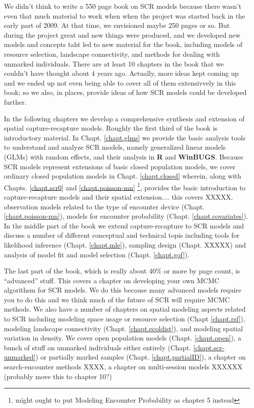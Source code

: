 We didn't think to write a 550 page book on SCR models because there
wasn't even that much material to work when when the project was
started back in the early part of 2009. At that time, we envisioned
maybe 250 pages or so. But during the project great and new things
were produced, and we developed new models and concepts taht led to
new material for the book, including models of resource selection,
landscape connectivity, and methods for dealing with unmarked
individuals. There are at least 10 chapters in the book that we
couldn't have thought about 4 years ago. Actually, more ideas kept
coming up and we ended up not even being able to cover all of them
extensivvely in this book; so we also, in places, provide ideas of how
SCR models could be developed further.

In the following chapters we develop a comprehensive synthesis and
extension of spatial capture-recapture models.  Roughly the first
third of the book is introductory material. In
Chapt. \ref{chapt.glms} we provide the basic analysis tools to
understand and analyze SCR models, namely generalized linear models
(GLMs) with random effects, and their analysis in {\bf R} and {\bf
  WinBUGS}.  Because SCR models represent extensions of basic closed
population models, we cover ordinary closed population models in
Chapt. \ref{chapt.closed} wherein, along with Chapts. \ref{chapt.scr0}
and \ref{chapt.poisson-mn} \footnote{might ought to put Modeling
  Encounter Probability as chapter 5 instead}, provides the basic
introduction to capture-recapture models and their spatial
extension.... this covers XXXXX.  observation models related to the
type of encounter device (Chapt. \ref{chapt.poisson-mn}), models for
encounter probability (Chapt. \ref{chapt.covariates}). In the middle
part of the book we extend capture-recapture to SCR models and discuss
a number of different conceptual and technical topis including tools
for likelihood inference (Chapt. \ref{chapt.mle}), sampling design
(Chapt. XXXXX) and analysis of model fit and model selection
(Chapt. \ref{chapt.gof}).

The last part of the book, which is really about 40\% or more by page
count, is ``advanced'' stuff. This covers a chapter on developing your
own MCMC algorithsm for SCR models. We do this because many advanced
models require you to do this and we think much of the future of SCR
will require MCMC methods. 
We also have a number of chapters on spatial modeling aspects related
to SCR including modeling 
space usage or resource selection (Chapt \ref{chapt.rsf}), modeling
landscape connectivity (Chapt. \ref{chapt.ecoldist}), and modeling
spatial variation in density. 
We cover open population models (Chapt. \ref{chapt.open}),
a bunch of stuff on unmarked individuals either entirely (Chapt. \ref{chapt.scr-unmarked})
or partially marked samples (Chapt. \ref{chapt.partialID}), 
a chapter on search-encounter methods XXXX, a chapter on multi-session
models XXXXXX (probably move this to chapter 10?)


